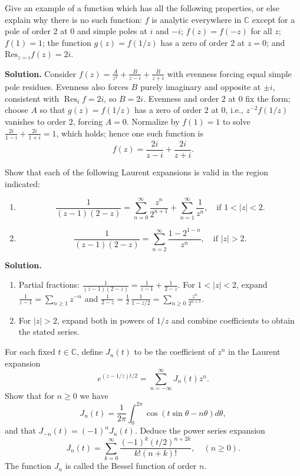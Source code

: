 \begin{problembox}
Give an example of a function which has all the following properties, or else explain why there is no such function: \( f \) is analytic everywhere in \( \mathbb{C} \) except for a pole of order 2 at 0 and simple poles at \( i \) and \( -i \); \( f(z) = f(-z) \) for all \( z \); \( f(1) = 1 \); the function \( g(z) = f(1/z) \) has a zero of order 2 at \( z = 0 \); and \( \text{Res}_{z=i} f(z) = 2i \).
\end{problembox}

\noindent\textbf{Solution.}
Consider $f(z)=\frac{A}{z^2}+\frac{B}{z-i}+\frac{B}{z+i}$ with evenness forcing equal simple pole residues. Evenness also forces $B$ purely imaginary and opposite at $\pm i$, consistent with $\operatorname{Res}_{i}f=2i$, so $B=2i$. Evenness and order $2$ at $0$ fix the form; choose $A$ so that $g(z)=f(1/z)$ has a zero of order $2$ at $0$, i.e., $z^{-2}f(1/z)$ vanishes to order $2$, forcing $A=0$. Normalize by $f(1)=1$ to solve $\frac{2i}{1-i}+\frac{2i}{1+i}=1$, which holds; hence one such function is
\[f(z)=\frac{2i}{z-i}+\frac{2i}{z+i}.
\]

\begin{problembox}
Show that each of the following Laurent expansions is valid in the region indicated:
\begin{enumerate}[label=(\alph*)]
\item \[ \frac{1}{(z - 1)(2 - z)} = \sum_{n=0}^{\infty} \frac{z^n}{2^{n+1}} + \sum_{n=1}^{\infty} \frac{1}{z^n}, \quad \text{if } 1 < |z| < 2. \]
\item \[ \frac{1}{(z - 1)(2 - z)} = \sum_{n=2}^{\infty} \frac{1 - 2^{1-n}}{z^n}, \quad \text{if } |z| > 2. \]
\end{enumerate}
\end{problembox}

\noindent\textbf{Solution.}
\begin{enumerate}[label=(\alph*)]
\item Partial fractions: $\frac{1}{(z-1)(2-z)}=\frac{1}{z-1}+\frac{1}{2-z}$. For $1<|z|<2$, expand $\frac{1}{z-1}=\sum_{n\ge1}z^{-n}$ and $\frac{1}{2-z}=\frac{1}{2}\,\frac{1}{1-z/2}=\sum_{n\ge0}\frac{z^n}{2^{n+1}}$.
\item For $|z|>2$, expand both in powers of $1/z$ and combine coefficients to obtain the stated series.
\end{enumerate}

\begin{problembox}
For each fixed \( t \in \mathbb{C} \), define \( J_n(t) \) to be the coefficient of \( z^n \) in the Laurent expansion
\[ e^{(z - 1/z)t/2} = \sum_{n=-\infty}^{\infty} J_n(t) z^n. \]
Show that for \( n \geq 0 \) we have
\[ J_n(t) = \frac{1}{2\pi} \int_0^{2\pi} \cos (t \sin \theta - n \theta) d\theta, \]
and that \( J_{-n}(t) = (-1)^n J_n(t) \). Deduce the power series expansion
\[ J_n(t) = \sum_{k=0}^{\infty} \frac{(-1)^k (t/2)^{n + 2k}}{k! (n + k)!}, \quad (n \geq 0). \]
The function \( J_n \) is called the Bessel function of order \( n \).
\end{problembox}

